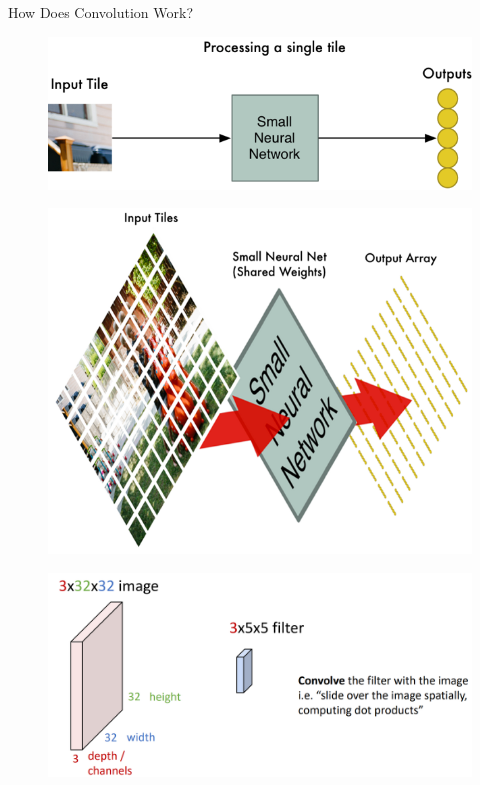 \begin{frame}[allowframebreaks]{How Does Convolution Work?}
\framebreak

\begin{figure}
\centering
\includegraphics[width=1.0\textwidth,height=0.9\textheight,keepaspectratio]{images/cnn/conv_4.png}
\end{figure}

\framebreak

\begin{figure}
\centering
\includegraphics[width=1.0\textwidth,height=0.9\textheight,keepaspectratio]{images/cnn/conv_5.png}
\end{figure}

\framebreak

\begin{figure}
\centering
\includegraphics[width=1.0\textwidth,height=0.9\textheight,keepaspectratio]{images/cnn/conv_6.png}
\end{figure}


\end{frame}
